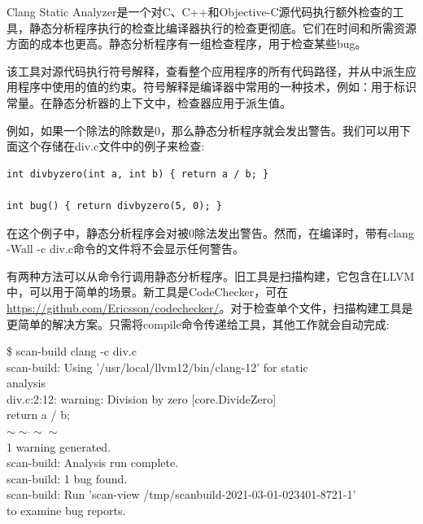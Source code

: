 Clang Static Analyzer是一个对C、C++和Objective-C源代码执行额外检查的工具，静态分析程序执行的检查比编译器执行的检查更彻底。它们在时间和所需资源方面的成本也更高。静态分析程序有一组检查程序，用于检查某些bug。\par

该工具对源代码执行符号解释，查看整个应用程序的所有代码路径，并从中派生应用程序中使用的值的约束。符号解释是编译器中常用的一种技术，例如：用于标识常量。在静态分析器的上下文中，检查器应用于派生值。\par

例如，如果一个除法的除数是0，那么静态分析程序就会发出警告。我们可以用下面这个存储在div.c文件中的例子来检查:\par

\begin{lstlisting}[caption={}]
int divbyzero(int a, int b) { return a / b; }

int bug() { return divbyzero(5, 0); }
\end{lstlisting}

在这个例子中，静态分析程序会对被0除法发出警告。然而，在编译时，带有clang -Wall -c div.c命令的文件将不会显示任何警告。\par

有两种方法可以从命令行调用静态分析程序。旧工具是扫描构建，它包含在LLVM中，可以用于简单的场景。新工具是CodeChecker，可在\url{https://github.com/Ericsson/codechecker/}。对于检查单个文件，扫描构建工具是更简单的解决方案。只需将compile命令传递给工具，其他工作就会自动完成:\par

\begin{tcolorbox}[colback=white,colframe=black]
\$ scan-build clang -c div.c \\
scan-build: Using '/usr/local/llvm12/bin/clang-12' for static \\
analysis \\
div.c:2:12: warning: Division by zero [core.DivideZero] \\
\hspace*{0.5cm}return a / b; \\
\hspace*{1.3cm}$\sim\sim\hat{}\sim\sim$ \\
1 warning generated. \\
scan-build: Analysis run complete. \\
scan-build: 1 bug found. \\
scan-build: Run 'scan-view /tmp/scanbuild-2021-03-01-023401-8721-1' \\
to examine bug reports.
\end{tcolorbox}

